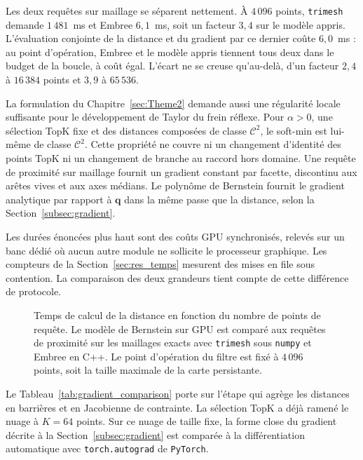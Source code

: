Les deux requêtes sur maillage se séparent nettement. À $4\,096$ points, \texttt{trimesh} demande $1\,481$~ms et Embree $6{,}1$~ms, soit un facteur $3{,}4$ sur le modèle appris. L'évaluation conjointe de la distance et du gradient par ce dernier coûte $6{,}0$~ms : au point d'opération, Embree et le modèle appris tiennent tous deux dans le budget de la boucle, à coût égal. L'écart ne se creuse qu'au-delà, d'un facteur $2{,}4$ à $16\,384$ points et $3{,}9$ à $65\,536$.

La formulation du Chapitre~\ref{sec:Theme2} demande aussi une régularité locale suffisante pour le développement de Taylor du frein réflexe. Pour $\alpha>0$, une sélection TopK fixe et des distances composées de classe $\mathcal{C}^2$, le soft-min est lui-même de classe $\mathcal{C}^2$. Cette propriété ne couvre ni un changement d'identité des points TopK ni un changement de branche au raccord hors domaine. Une requête de proximité sur maillage fournit un gradient constant par facette, discontinu aux arêtes vives et aux axes médians. Le polynôme de Bernstein fournit le gradient analytique par rapport à $\mathbf{q}$ dans la même passe que la distance, selon la Section~\ref{subsec:gradient}.

Les durées énoncées plus haut sont des coûts \ac{GPU} synchronisés, relevés sur un banc dédié où aucun autre module ne sollicite le processeur graphique. Les compteurs de la Section~\ref{sec:res_temps} mesurent des mises en file sous contention. La comparaison des deux grandeurs tient compte de cette différence de protocole.

\begin{figure}[!htbp]
    \centering
    
    \caption[Temps de calcul de la distance selon les requêtes]{Temps de calcul de la distance en fonction du nombre de points de requête. Le modèle de Bernstein sur \ac{GPU} est comparé aux requêtes de proximité sur les maillages exacts avec \texttt{trimesh} sous \texttt{numpy} et Embree en C++. Le point d'opération du filtre est fixé à $4\,096$ points, soit la taille maximale de la carte persistante.}\label{fig:temps_SDF}
\end{figure}

Le Tableau~\ref{tab:gradient_comparison} porte sur l'étape qui agrège les distances en barrières et en Jacobienne de contrainte. La sélection TopK a déjà ramené le nuage à $K=64$ points. Sur ce nuage de taille fixe, la forme close du gradient décrite à la Section~\ref{subsec:gradient} est comparée à la différentiation automatique avec \texttt{torch.autograd} de \texttt{PyTorch}.

